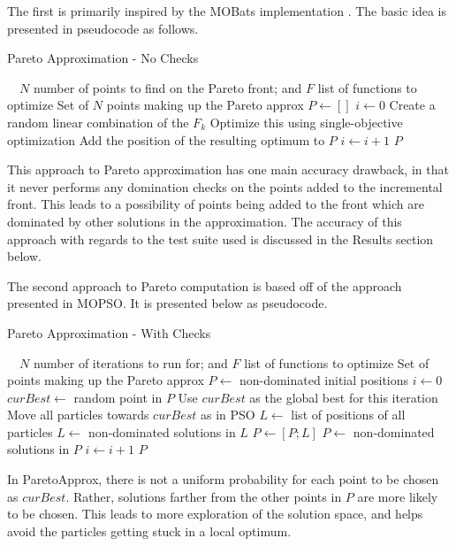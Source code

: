 \documentclass[letterpaper, 10 pt, conference]{ieeeconf}  %
\begin{document}
The first is primarily inspired by the MOBats implementation \cite{MOBatsCode}.  The basic idea is presented in pseudocode as follows.
\begin{algorithm}[h]
\caption{Pareto Approximation - No Checks}
\begin{algorithmic}[1]
\Input $\quad N$ number of points to find on the Pareto front; and  
       $F$ list of functions to optimize
\Output Set of $N$ points making up the Pareto approx
\State ${P \gets []}$
\State ${i \gets 0}$
	\State Create a random linear combination of the $F_k$
	\State Optimize this using single-objective optimization
	\State Add the position of the resulting optimum to $P$
	\State ${i \gets i + 1}$
\EndWhile
\Return $P$
\EndProcedure
\end{algorithmic}
\end{algorithm}  

This approach to Pareto approximation has one main accuracy drawback, in that it never performs any domination checks on the points added to the incremental front.  This leads to a possibility of points being added to the front which are dominated by other solutions in the approximation.  The accuracy of this approach with regards to the test suite used is discussed in the Results section below.

The second approach to Pareto computation is based off of the approach presented in MOPSO.  It is presented below as pseudocode.
\begin{algorithm}[h]
\caption{Pareto Approximation - With Checks}
\begin{algorithmic}[1]
\Input $\quad N$ number of iterations to run for; and  
       $F$ list of functions to optimize
\Output Set of points making up the Pareto approx
\State ${P \gets}$ non-dominated initial positions
\State ${i \gets 0}$
	\State ${curBest \gets}$ random point in $P$
	\State Use $curBest$ as the global best for this iteration
	\State Move all particles towards $curBest$ as in PSO
	\State ${L \gets}$ list of positions of all particles
	\State ${L \gets}$ non-dominated solutions in $L$
	\State ${P \gets [P; L]}$
	\State ${P \gets}$ non-dominated solutions in $P$
	\State ${i \gets i + 1}$
\EndWhile
\Return $P$
\EndProcedure
\end{algorithmic}
\end{algorithm}

In ParetoApprox, there is not a uniform probability for each point to be chosen as $curBest$.  Rather, solutions farther from the other points in $P$ are more likely to be chosen.  This leads to more exploration of the solution space, and helps avoid the particles getting stuck in a local optimum.
\end{document}
